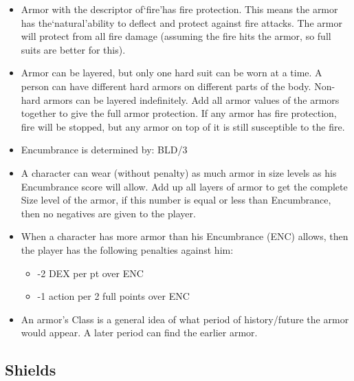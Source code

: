 \documentclass[twoside]{book}
\begin{document}
\begin{itemize}
  \item Armor with the descriptor of`fire'has fire protection. This means the armor has the`natural'ability to deflect and protect against fire attacks. The armor will protect from all fire damage (assuming the fire hits the armor, so full suits are better for this).
  \item Armor can be layered, but only one hard suit can be worn at a time. A person can have different hard armors on different parts of the body. Non-hard armors can be layered indefinitely. Add all armor values of the armors together to give the full armor protection. If any armor has fire protection, fire will be stopped, but any armor on top of it is still susceptible to the fire.
  \item Encumbrance is determined by: BLD/3
  \item A character can wear (without penalty) as much armor in size levels as his Encumbrance score will allow. Add up all layers of armor to get the complete Size level of the armor, if this number is equal or less than Encumbrance, then no negatives are given to the player.
  \item When a character has more armor than his Encumbrance (ENC) allows, then the player has the following penalties against him:
\begin{itemize}
      
  \item -2 DEX per pt over ENC
  \item -1 action per 2 full points over ENC
\end{itemize}
  
  \item An armor's Class is a general idea of what period of history/future the armor would appear. A later period can find the earlier armor.
\end{itemize}
  
    

\subsection{Shields}
    
\end{document}
